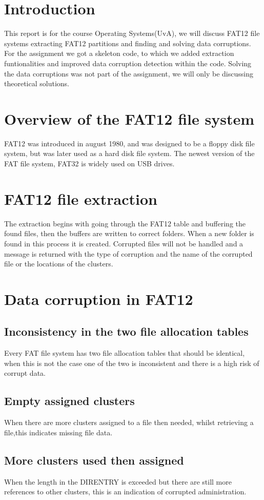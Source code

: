 \documentclass[pdftex,12pt,a4paper]{article}
\begin{document}
\tableofcontents
\newpage
\section{Introduction}
This report is for the course Operating Systems(UvA), we will discuss FAT12 file systems extracting FAT12 partitions and finding and solving data corruptions. For the assignment we got a skeleton code, to which we added extraction funtionalities and improved data corruption detection within the code. Solving the data corruptions was not part of the assignment, we will only be discussing theoretical solutions.
\section{Overview of the FAT12 file system}
FAT12 was introduced in august 1980, and was designed to be a floppy disk file system, but was later used as a hard disk file system. The newest version of the FAT file system, FAT32 is widely used on USB drives.
\section{FAT12 file extraction}
The extraction begins with going through the FAT12 table and buffering the found files, then the buffers are written to correct folders. When a new folder is found in this process it is created. Corrupted files will not be handled and a message is returned with the type of corruption and the name of the corrupted file or the locations of the clusters.
\section{Data corruption in FAT12}
\subsection{Inconsistency in the two file allocation tables}
Every FAT file system has two file allocation tables that should be identical, when this is not the case one of the two is inconsistent and there is a high risk of corrupt data.
\subsection{Empty assigned clusters}
When there are more clusters assigned to a file then needed, whilst retrieving a file,this indicates missing file data. 
\subsection{More clusters used then assigned}
When the length in the DIRENTRY is exceeded but there are still more references to other clusters, this is an indication of corrupted administration.
\end{document}
